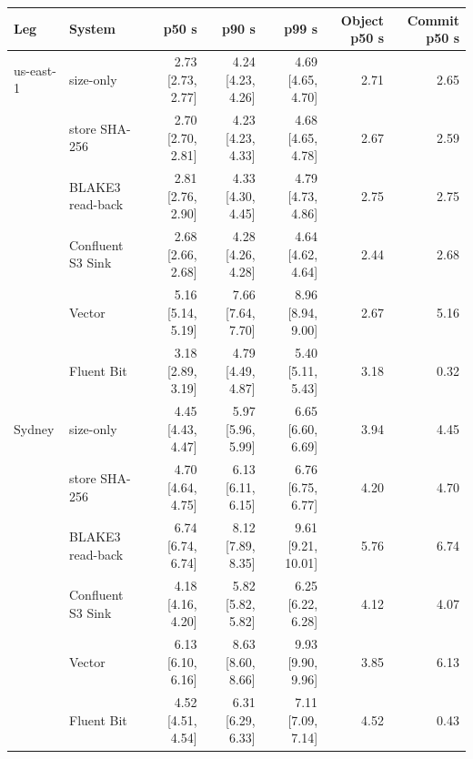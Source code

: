 
\begin{tabular}{@{}llrrrrr@{}}
\toprule
Leg & System & p50 s & p90 s & p99 s & Object p50 s & Commit p50 s \\
\midrule
us-east-1 & \sysname{} size-only & 2.73 [2.73, 2.77] & 4.24 [4.23, 4.26] & 4.69 [4.65, 4.70] & 2.71 & 2.65 \\
 & \sysname{} store SHA-256 & 2.70 [2.70, 2.81] & 4.23 [4.23, 4.33] & 4.68 [4.65, 4.78] & 2.67 & 2.59 \\
 & \sysname{} BLAKE3 read-back & 2.81 [2.76, 2.90] & 4.33 [4.30, 4.45] & 4.79 [4.73, 4.86] & 2.75 & 2.75 \\
 & Confluent S3 Sink & 2.68 [2.66, 2.68] & 4.28 [4.26, 4.28] & 4.64 [4.62, 4.64] & 2.44 & 2.68 \\
 & Vector & 5.16 [5.14, 5.19] & 7.66 [7.64, 7.70] & 8.96 [8.94, 9.00] & 2.67 & 5.16 \\
 & Fluent Bit & 3.18 [2.89, 3.19] & 4.79 [4.49, 4.87] & 5.40 [5.11, 5.43] & 3.18 & 0.32 \\
\addlinespace[1pt]
Sydney & \sysname{} size-only & 4.45 [4.43, 4.47] & 5.97 [5.96, 5.99] & 6.65 [6.60, 6.69] & 3.94 & 4.45 \\
 & \sysname{} store SHA-256 & 4.70 [4.64, 4.75] & 6.13 [6.11, 6.15] & 6.76 [6.75, 6.77] & 4.20 & 4.70 \\
 & \sysname{} BLAKE3 read-back & 6.74 [6.74, 6.74] & 8.12 [7.89, 8.35] & 9.61 [9.21, 10.01] & 5.76 & 6.74 \\
 & Confluent S3 Sink & 4.18 [4.16, 4.20] & 5.82 [5.82, 5.82] & 6.25 [6.22, 6.28] & 4.12 & 4.07 \\
 & Vector & 6.13 [6.10, 6.16] & 8.63 [8.60, 8.66] & 9.93 [9.90, 9.96] & 3.85 & 6.13 \\
 & Fluent Bit & 4.52 [4.51, 4.54] & 6.31 [6.29, 6.33] & 7.11 [7.09, 7.14] & 4.52 & 0.43 \\
\bottomrule
\end{tabular}
